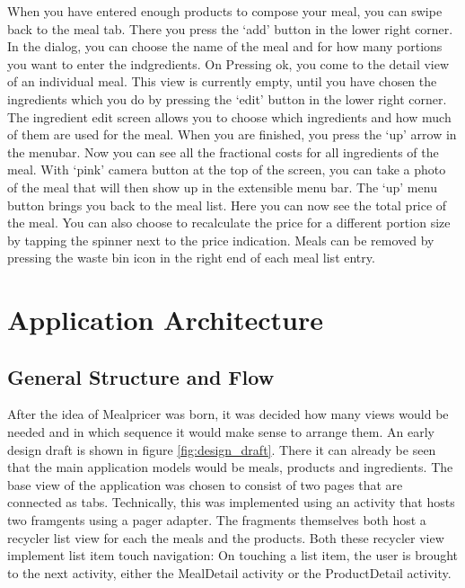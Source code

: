 \documentclass[a4paper,11pt,twoside]{article}
\begin{document}
When you have entered enough products to compose your meal, you can swipe back
to the meal tab. There you press the `add' button in the lower right corner.
In the dialog, you can choose the name of the meal and for how many portions
you want to enter the indgredients. On Pressing ok, you come to the detail
view of an individual meal. This view is currently empty, until you have chosen
the ingredients which you do by pressing the `edit' button in the lower right
corner. The ingredient edit screen allows you to choose which ingredients and
how much of them are used for the meal. When you are finished, you press the
`up' arrow in the menubar. Now you can see all the fractional costs for all
ingredients of the meal. With `pink' camera button at the top of the screen,
you can take a photo of the meal that will then show up in the extensible
menu bar. The `up' menu button brings you back to the meal list. Here you can
now see the total price of the meal. You can also choose to recalculate the
price for a different portion size by tapping the spinner next to the price
indication. Meals can be removed by pressing the waste bin icon in the right
end of each meal list entry.



\section{Application Architecture}
\subsection{General Structure and Flow}
After the idea of Mealpricer was born, it was decided how many views
would be needed and in which sequence it would make sense to arrange them. An
early design draft is shown in figure \ref{fig:design_draft}. There it can already be seen that the
main application models would be meals, products and ingredients. The base view
of the application was chosen to consist of two pages that are connected as
tabs. Technically, this was implemented using an activity that hosts two framgents
using a pager adapter. The fragments themselves both host a recycler list view
for each the meals and the products. Both these recycler view implement list
item touch navigation: On touching a list item, the user is brought to the next
activity, either the MealDetail activity or the ProductDetail activity.
\end{document}
